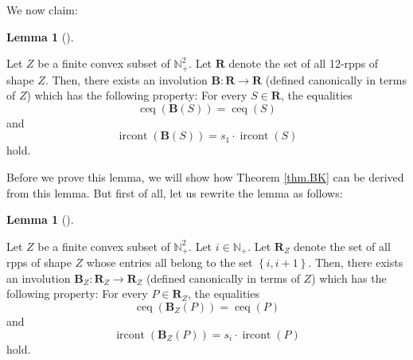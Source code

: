 \documentclass[numbers=enddot,12pt,final,onecolumn,notitlepage]{scrartcl}%
\theoremstyle{definition}
\newtheorem{lem}[theo]{Lemma}
\newenvironment{lemma}[1][]
{\begin{lem}[#1]\begin{leftbar}}
{\end{leftbar}\end{lem}}
\begin{document}
We now claim:

\begin{lemma}
\label{lem.BK}Let $Z$ be a finite convex subset of $\mathbb{N}_{+}^{2}$. Let
$\mathbf{R}$ denote the set of all 12-rpps of shape $Z$. Then, there exists an
involution $\mathbf{B}:\mathbf{R}\rightarrow\mathbf{R}$ (defined canonically
in terms of $Z$) which has the following property: For every $S\in\mathbf{R}$,
the equalities%
\begin{equation}
\operatorname*{ceq}\left(  \mathbf{B}\left(  S\right)  \right)
=\operatorname*{ceq}\left(  S\right)  \label{eq.lem.BK.ceq}%
\end{equation}
and%
\begin{equation}
\operatorname*{ircont}\left(  \mathbf{B}\left(  S\right)  \right)  =s_{1}%
\cdot\operatorname*{ircont}\left(  S\right)  \label{eq.lem.BK.ircont}%
\end{equation}
hold.
\end{lemma}

Before we prove this lemma, we will show how Theorem \ref{thm.BK} can be
derived from this lemma. But first of all, let us rewrite the lemma as follows:

\begin{lemma}
\label{lem.BKi}Let $Z$ be a finite convex subset of $\mathbb{N}_{+}^{2}$. Let
$i\in\mathbb{N}_{+}$. Let $\mathbf{R}_{Z}$ denote the set of all rpps of shape
$Z$ whose entries all belong to the set $\left\{  i,i+1\right\}  $. Then,
there exists an involution $\mathbf{B}_{Z}:\mathbf{R}_{Z}\rightarrow
\mathbf{R}_{Z}$ (defined canonically in terms of $Z$) which has the following
property: For every $P\in\mathbf{R}_{Z}$, the equalities%
\begin{equation}
\operatorname*{ceq}\left(  \mathbf{B}_{Z}\left(  P\right)  \right)
=\operatorname*{ceq}\left(  P\right)  \label{eq.lem.BKi.ceq}%
\end{equation}
and%
\begin{equation}
\operatorname*{ircont}\left(  \mathbf{B}_{Z}\left(  P\right)  \right)
=s_{i}\cdot\operatorname*{ircont}\left(  P\right)  \label{eq.lem.BKi.ircont}%
\end{equation}
hold.
\end{lemma}
\end{document}
